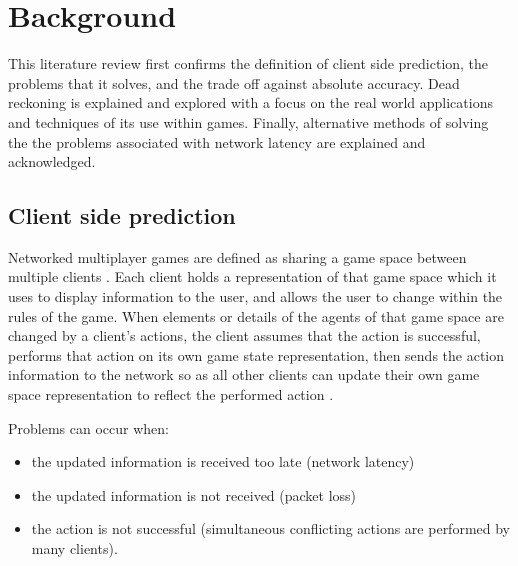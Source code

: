 \documentclass[journal]{IEEEtran}
\begin{document}
\section{Background}

This literature review first confirms the definition of client side prediction, the problems that it solves, and the trade off against absolute accuracy. Dead reckoning is explained and explored with a focus on the real world applications and techniques of its use within games. Finally, alternative methods of solving the the problems associated with network latency are explained and acknowledged.

\subsection{Client side prediction}

Networked multiplayer games are defined as sharing a game space between multiple clients \cite{diot1999distributed}. Each client holds a representation of that game space which it uses to display information to the user, and allows the user to change within the rules of the game. When elements or details of the agents of that game space are changed by a client's actions, the client assumes that the action is successful, performs that action on its own game state representation, then sends the action information to the network so as all other clients can update their own game space representation to reflect the performed action \cite{bernier2001latency}.

Problems can occur when:
\begin{itemize}
    \item the updated information is received too late (network latency)
    \item the updated information is not received (packet loss)
    \item the action is not successful (simultaneous conflicting actions are performed by many clients).
\end{itemize}
\end{document}
